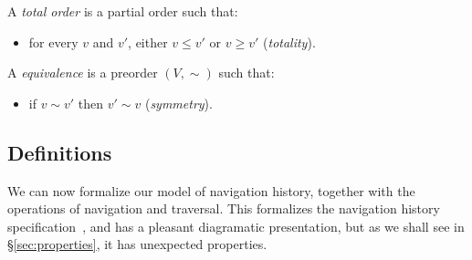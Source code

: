 \documentclass{notes}
\newcommand{\Verts}{V}
\newcommand{\aVert}{v}
\begin{document}
A \emph{total order} is a partial order such that:
\begin{itemize}
\item for every $\aVert$ and $\aVert'$, either $\aVert\le\aVert'$ or $\aVert\ge\aVert'$ (\emph{totality}).
\end{itemize}
A \emph{equivalence} is a preorder $(\Verts,{\sim})$ such that:
\begin{itemize}
\item if $\aVert\sim\aVert'$ then $\aVert'\sim\aVert$ (\emph{symmetry}).
\end{itemize}

\subsection{Definitions}
\label{sec:defns}

We can now formalize our model of navigation history, together with
the operations of navigation and traversal. This formalizes the
navigation history specification~\cite{whatwg}, and has a pleasant
diagramatic presentation, but as we shall see in
\S\ref{sec:properties}, it has unexpected properties.
\end{document}
